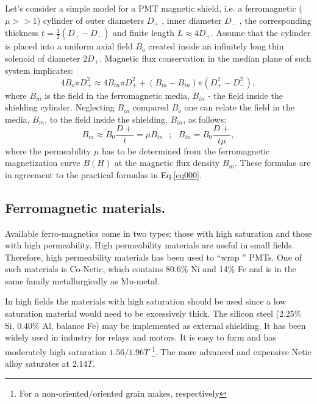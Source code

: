 \documentclass[12pt]{article}
\begin{document}
Let's consider a simple  model for a PMT  magnetic shield, 
i.e. a ferromagnetic ($\mu>>1$) cylinder of outer   diameters $D_+$ , inner diameter $D_-$ , the corresponding 
thickness $t=\frac{1}{2}(D_+-D_-)$ and finite length $L\approx 4D_+$.  Assume that the cylinder is  
placed into a uniform axial  field $B_o$ created
inside an infinitely long thin  solenoid of  diameter  $2D_+$.
Magnetic flux conservation in the median plane of  such system implicates:
\begin{equation}
4B_o \pi D_+^2 \approx 4B_{in} \pi D_+^2 + (B_m-B_{in}) \pi (D_+^2-D_-^2),
\label{eq004}
\end{equation}
where  $B_m$ is the  field in the ferromagnetic media, $B_{in}$ - the field  inside  the shielding cylinder.
Neglecting $B_{in}$ compared $B_o$ one can relate   the field in the media, $B_m$, to the field inside the 
shielding, $B_{in}$, as follows:
 \begin{equation}
B_m  \approx B_0\frac{D+}{t}=\mu B_{in}~~~;~~~B_{in}= B_0\frac{D+}{t\mu},
\label{eq003}
\end{equation}
where the permeability $\mu$  has to be determined  from the ferromagnetic  magnetization curve $B(H)$ at
the  magnetic flux density  $B_m$. 
These formulas  are  in agreement to the practical  formulas in Eq.\ref{eq000}.






\subsection{Ferromagnetic materials.}
Available ferro-magnetics come in two types: those with high saturation and
those with high permeability.
High permeability materials are useful  in small  fields.
Therefore,  high permeability materials has been  used to ``wrap '' PMTs.  
One of such materials is Co-Netic, which contains 80.6\% Ni and 14\% Fe and is in the 
same family metallurgically as Mu-metal. 
 
In high fields  the  materials with high saturation should be used
since a low saturation material would need to be excessively thick.
The   silicon steel (2.25\% Si, 0.40\% Al, balance Fe) may be implemented as 
external shielding. It has been  widely used  in  industry for relays and motors.
It  is easy to form and  has moderately high saturation  $1.56/1.96T$
\footnote{For a  non-oriented/oriented grain makes, respectively}.
The more advanced and expensive  Netic alloy saturates at $2.14T$.
\end{document}
